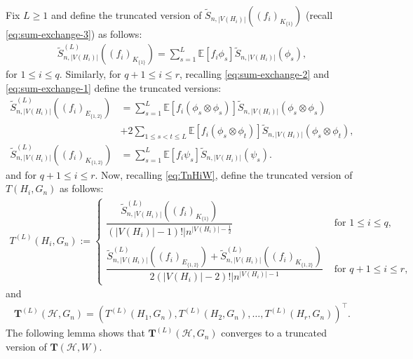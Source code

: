 \documentclass[11pt,reqno]{amsart}
\numberwithin{equation}{section}
\newcommand{\cH}{{\mathcal H}}
\theoremstyle{definition}
\begin{document}
Fix $L \geq 1$ and define the truncated version of $ \tilde{S}_{n,|V(H_i)|}((f_{i})_{K_{\{1\}}})$ (recall \eqref{eq:sum-exchange-3}) as follows: 
\begin{align}
    \tilde{S}_{n,|V(H_i)|}^{(L)}((f_{i})_{K_{\{1\}}}) = \sum_{s = 1}^L \mathbb{E}\left[f_{i}\phi_{s}\right]\tilde{S}_{n,|V(H_i)|}\left(\phi_{s}\right) , \nonumber 
\end{align} 
for $1\leq i\leq q$. Similarly, for $q+1 \leq i \leq r$, recalling \eqref{eq:sum-exchange-2} and \eqref{eq:sum-exchange-1} define the truncated versions: 
\begin{align}
    \tilde{S}_{n,|V(H_i)|}^{(L)}((f_{i})_{E_{\{1,2\}}}) 
    & = \sum_{s = 1}^L \mathbb{E}\left[f_{i}(\phi_{s}\otimes\phi_{s})\right]\tilde{S}_{n,|V(H_i)|}\left(\phi_{s}\otimes\phi_{s}\right)\nonumber\\
    & + 2\sum_{1 \leq s < t \leq L}\mathbb{E}\left[f_{i}(\phi_{s}\otimes\phi_{t})\right]\tilde{S}_{n,|V(H_i)|}\left(\phi_{s}\otimes\phi_{t}\right), \nonumber \\ 
    \tilde{S}_{n,|V(H_i)|}^{(L)}((f_{i})_{K_{\{1,2\}}}) & = \sum_{s = 1}^L \mathbb{E}\left[f_{i}\psi_{s}\right]\tilde{S}_{n,|V(H_i)|}(\psi_{s}) . \nonumber 
\end{align} 
and for $q+1\leq i\leq r$. Now, recalling \eqref{eq:TnHiW}, define the truncated version of $T(H_i, G_n)$ as follows: 
\begin{align}\label{eq:TnLHiW}
T^{(L)}(H_i, G_n) := 
\left\{
\begin{array}{cc}
  \dfrac{\tilde{S}_{n,|V(H_i)|}^{(L)}((f_i)_{K_{\{1\}}})}{(|V(H_i)|-1)!| n^{|V(H_i)|-\frac{1}{2}}} & \text{ for } 1 \leq i \leq q , \\ \\ 
 \dfrac{ \tilde{S}_{n,|V(H_i)|}^{(L)}((f_i)_{E_{\{1,2\}}}) + \tilde{S}_{n,|V(H_i)|}^{(L)}((f_i)_{{K_{\{1,2\}}}}) }{2(|V(H_i)|-2)!| n^{|V(H_i)|-1}} & \text{ for } q+1 \leq i \leq r , 
\end{array}
\right. 
\end{align} 
and 
\begin{align}\label{eq:TnLHW}
\bm T^{(L)}(\mathcal H, G_n) = (T^{(L)}(H_1, G_n), T^{(L)}(H_2, G_n), \ldots, T^{(L)}(H_r, G_n))^\top. 
\end{align}  
The following lemma shows that $\bm T^{(L)}(\mathcal H, G_n)$ converges to a truncated version of $\bm T(\cH, W)$. 
\end{document}

